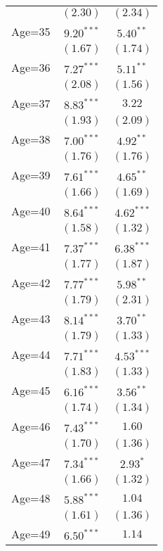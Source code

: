 \documentclass[fullpage]{paper}
\begin{document}
\begin{center}
\begin{longtable}{l c c }
            & $(2.30)$      & $(2.34)$      \\
Age=35      & $9.20^{***}$  & $5.40^{**}$   \\
            & $(1.67)$      & $(1.74)$      \\
Age=36      & $7.27^{***}$  & $5.11^{**}$   \\
            & $(2.08)$      & $(1.56)$      \\
Age=37      & $8.83^{***}$  & $3.22$        \\
            & $(1.93)$      & $(2.09)$      \\
Age=38      & $7.00^{***}$  & $4.92^{**}$   \\
            & $(1.76)$      & $(1.76)$      \\
Age=39      & $7.61^{***}$  & $4.65^{**}$   \\
            & $(1.66)$      & $(1.69)$      \\
Age=40      & $8.64^{***}$  & $4.62^{***}$  \\
            & $(1.58)$      & $(1.32)$      \\
Age=41      & $7.37^{***}$  & $6.38^{***}$  \\
            & $(1.77)$      & $(1.87)$      \\
Age=42      & $7.77^{***}$  & $5.98^{**}$   \\
            & $(1.79)$      & $(2.31)$      \\
Age=43      & $8.14^{***}$  & $3.70^{**}$   \\
            & $(1.79)$      & $(1.33)$      \\
Age=44      & $7.71^{***}$  & $4.53^{***}$  \\
            & $(1.83)$      & $(1.33)$      \\
Age=45      & $6.16^{***}$  & $3.56^{**}$   \\
            & $(1.74)$      & $(1.34)$      \\
Age=46      & $7.43^{***}$  & $1.60$        \\
            & $(1.70)$      & $(1.36)$      \\
Age=47      & $7.34^{***}$  & $2.93^{*}$    \\
            & $(1.66)$      & $(1.32)$      \\
Age=48      & $5.88^{***}$  & $1.04$        \\
            & $(1.61)$      & $(1.36)$      \\
Age=49      & $6.50^{***}$  & $1.14$        \\

\end{longtable}
\end{center}
\end{document}
